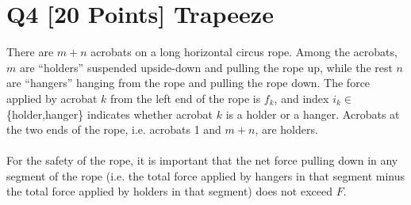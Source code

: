 \documentclass[10pt]{article}
\begin{document}
\section*{Q4 [20 Points] Trapeeze}
There are $m + n$ acrobats on a long horizontal circus rope. Among the acrobats, $m$ are “holders” suspended upside-down and pulling the rope up, while the rest $n$ are “hangers” hanging from the rope and pulling the rope down. The force applied by acrobat $k$ from the left end of the rope is $f_k$, and index $i_k \in$ \{holder,hanger\} indicates whether acrobat $k$ is a holder or a hanger. Acrobats at the two ends of the rope, i.e. acrobats 1 and $m + n$, are holders.
\\
\\
For the safety of the rope, it is important that the net force pulling down in any segment of the rope (i.e. the total force applied by hangers in that segment minus the total force applied by holders in that segment) does not exceed $F$.
\end{document}
